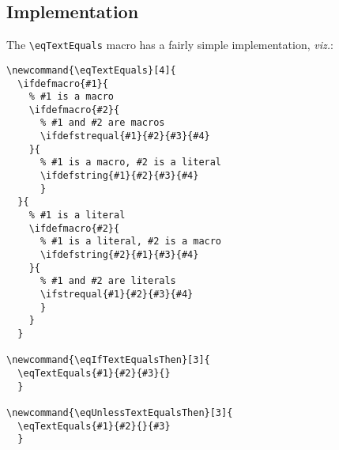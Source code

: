 \documentclass[a5paper,10pt,german]{article}
\begin{document}
\newpage
\subsection*{Implementation}

The \verb#\eqTextEquals# macro has a fairly simple implementation, {\em viz.}:

\begin{verbatim}
\newcommand{\eqTextEquals}[4]{
  \ifdefmacro{#1}{
    % #1 is a macro
    \ifdefmacro{#2}{
      % #1 and #2 are macros
      \ifdefstrequal{#1}{#2}{#3}{#4}
    }{
      % #1 is a macro, #2 is a literal
      \ifdefstring{#1}{#2}{#3}{#4}
      }
  }{
    % #1 is a literal
    \ifdefmacro{#2}{
      % #1 is a literal, #2 is a macro
      \ifdefstring{#2}{#1}{#3}{#4}
    }{
      % #1 and #2 are literals
      \ifstrequal{#1}{#2}{#3}{#4}
      }
    }
  }

\newcommand{\eqIfTextEqualsThen}[3]{
  \eqTextEquals{#1}{#2}{#3}{}
  }

\newcommand{\eqUnlessTextEqualsThen}[3]{
  \eqTextEquals{#1}{#2}{}{#3}
  }

\end{verbatim}
\end{document}

